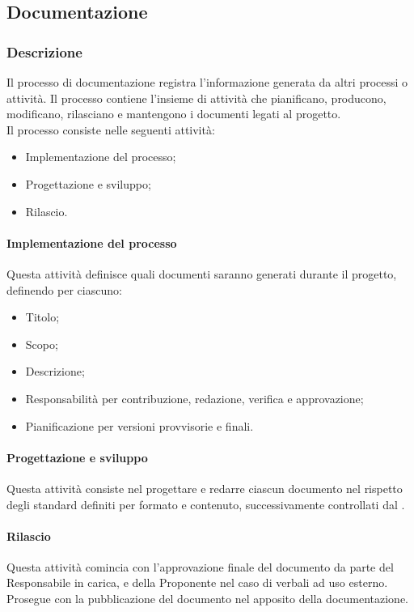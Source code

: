 \subsection{Documentazione}

\subsubsection{Descrizione}
Il processo di documentazione registra l'informazione generata da altri processi o attività. Il processo contiene l'insieme di attività che pianificano, producono, modificano, rilasciano e mantengono i documenti legati al progetto.\\
Il processo consiste nelle seguenti attività:
\begin{itemize}
  \item Implementazione del processo;
  \item Progettazione e sviluppo;
  \item Rilascio.
\end{itemize}

\paragraph{Implementazione del processo}\label{implementazioneprocessodocumentazione}
Questa attività definisce quali documenti saranno generati durante il progetto, definendo per ciascuno:
\begin{itemize}
  \item Titolo;
  \item Scopo;
  \item Descrizione;
  \item Responsabilità per contribuzione, redazione, verifica e approvazione;
  \item Pianificazione per versioni provvisorie e finali.
\end{itemize}

\paragraph{Progettazione e sviluppo}
Questa attività consiste nel progettare e redarre ciascun documento nel rispetto degli standard definiti per formato e contenuto, successivamente controllati dal \Verificatore.

\paragraph{Rilascio}
Questa attività comincia con l'approvazione finale del documento da parte del Responsabile in carica, e della Proponente nel caso di verbali ad uso esterno. Prosegue con la pubblicazione del documento nel  apposito della documentazione.

